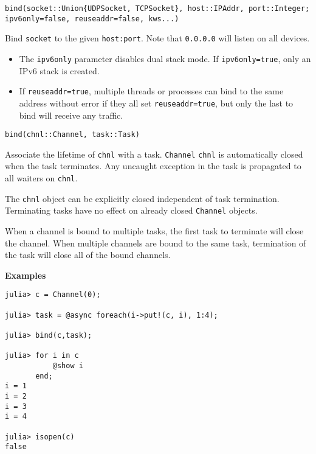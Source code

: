\begin{adjustwidth}{2em}{0pt}


\begin{verbatim}
bind(socket::Union{UDPSocket, TCPSocket}, host::IPAddr, port::Integer; ipv6only=false, reuseaddr=false, kws...)
\end{verbatim}

Bind \texttt{socket} to the given \texttt{host:port}. Note that \texttt{0.0.0.0} will listen on all devices.

\begin{itemize}
\item The \texttt{ipv6only} parameter disables dual stack mode. If \texttt{ipv6only=true}, only an IPv6 stack is created.


\item If \texttt{reuseaddr=true}, multiple threads or processes can bind to the same address without error if they all set \texttt{reuseaddr=true}, but only the last to bind will receive any traffic.

\end{itemize}



\begin{verbatim}
bind(chnl::Channel, task::Task)
\end{verbatim}

Associate the lifetime of \texttt{chnl} with a task. \texttt{Channel} \texttt{chnl} is automatically closed when the task terminates. Any uncaught exception in the task is propagated to all waiters on \texttt{chnl}.

The \texttt{chnl} object can be explicitly closed independent of task termination. Terminating tasks have no effect on already closed \texttt{Channel} objects.

When a channel is bound to multiple tasks, the first task to terminate will close the channel. When multiple channels are bound to the same task, termination of the task will close all of the bound channels.

\textbf{Examples}


\begin{verbatim}
julia> c = Channel(0);

julia> task = @async foreach(i->put!(c, i), 1:4);

julia> bind(c,task);

julia> for i in c
           @show i
       end;
i = 1
i = 2
i = 3
i = 4

julia> isopen(c)
false
\end{verbatim}



\end{adjustwidth}
